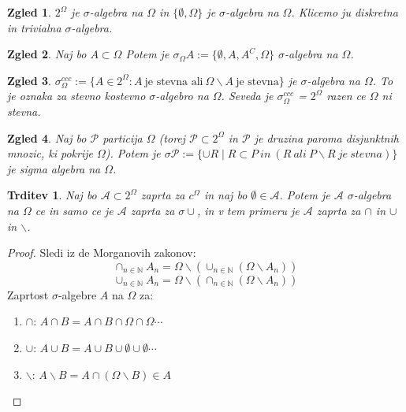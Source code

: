 \documentclass[a4paper,12pt]{article}
\newtheorem{trditev}{Trditev}
\newtheorem{zgled}{Zgled}
\newcommand{\N}{\mathbb{N}}
\newcommand{\A}{\mathcal{A}}
\begin{document}
        \begin{zgled}
            $2^\Omega$ je $\sigma$-algebra na $\Omega$ in $\{\emptyset, \Omega\}$ je $\sigma$-algebra na $\Omega$. Klicemo ju diskretna in trivialna $\sigma$-algebra.
        \end{zgled}

        \begin{zgled}
        Naj bo $A \subset \Omega$ Potem je $ \sigma_\Omega A:=\{\emptyset, A, A^C, \Omega\}$ $\sigma$-algebra na $\Omega$.
        \end{zgled}

        \begin{zgled}
        $\sigma_\Omega^{ccc} := \{ A \in 2^\Omega: A \ \text{je stevna ali} \ \Omega \backslash A \ \text{je stevna}\}$ je $\sigma$-algebra na $\Omega$.
        To je oznaka za stevno kostevno $\sigma$-algebro na $\Omega$. Seveda je $\sigma_\Omega^{ccc}$ = $2^\Omega$ razen ce $\Omega$ ni stevna.
        \end{zgled}

        \begin{zgled}
        Naj bo $\mathcal{P}$ particija $\Omega$ (torej $\mathcal{P} \subset 2^\Omega$ in $\mathcal{P}$ je druzina paroma disjunktnih mnozic, ki pokrije $\Omega$).
        Potem je $\sigma \mathcal{P} := \{\cup R \mid R \subset P \ in \ (R \ ali \ P\backslash R \ je \ stevna)\}$ je sigma algebra na $\Omega$.
        \end{zgled}

        \begin{trditev}
            Naj bo $\A \subset 2^\Omega$ zaprta za $c^\Omega$ in naj bo $\emptyset \in \A$. Potem je $\A$ $\sigma$-algebra na $\Omega$ ce in samo ce je $\A$ zaprta za $\sigma\cup$, in v tem primeru je $\A$ zaprta za $\cap$ in $\cup$ in $\backslash$.
        \end{trditev}
        \begin{proof}
            Sledi iz de Morganovih zakonov:
            $$
            \cap_{n \in \N} A_n = \Omega \backslash \left(\cup_{n \in \N}(\Omega\backslash A_n) \right)
            $$
            $$
            \cup_{n \in \N} A_n = \Omega \backslash \left(\cap_{n \in \N}(\Omega\backslash A_n) \right)
            $$
            Zaprtost $\sigma$-algebre $A$ na $\Omega$ za:
            \begin{enumerate}
                \item $\cap$: $A \cap B = A \cap B \cap \Omega \cap \Omega \cdots$
                \item $\cup$: $A \cup B = A \cup B \cup \emptyset \cup \emptyset \cdots$
                \item $\backslash$: $A \backslash B = A  \cap \left( \Omega \backslash B \right) \in A$
            \end{enumerate}

        \end{proof}
\end{document}
